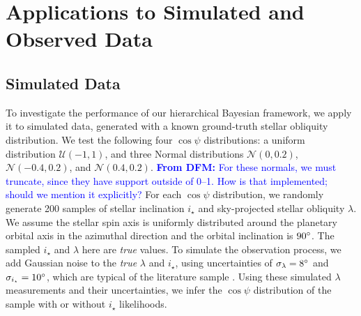 \documentclass[twocolumn,times]{aastex631}
\newcommand{\dfm}[1]{\textcolor{blue}{\textbf{From DFM:} #1}}
\begin{document}
\section{Applications to Simulated and Observed Data}\label{sec:applications}

\subsection{Simulated Data}\label{subsec:sims}

To investigate the performance of our hierarchical Bayesian framework, we apply it to simulated data, generated with a known ground-truth stellar obliquity distribution.
We test the following four $\cos{\psi}$ distributions: a uniform distribution $\mathcal{U}(-1,1)$, and three Normal distributions $\mathcal{N}(0,0.2)$, $\mathcal{N}(-0.4,0.2)$, and $\mathcal{N}(0.4,0.2)$.
\dfm{For these normals, we must truncate, since they have support outside of 0--1. How is that implemented; should we mention it explicitly?}
For each $\cos{\psi}$ distribution, we randomly generate 200 samples of stellar inclination $i_\star$ and sky-projected stellar obliquity $\lambda$. We assume the stellar spin axis is uniformly distributed around the planetary orbital axis in the azimuthal direction and the orbital inclination is $90\mbox{$^\circ$}$. 
The sampled $i_\star$ and $\lambda$ here are \emph{true} values. 
To simulate the observation process, we add Gaussian noise to the \emph{true} $\lambda$ and $i_\star$, using uncertainties of $\sigma_{\lambda} = 8\mbox{$^\circ$}$ and $\sigma_{i_\star} = 10\mbox{$^\circ$}$, which are typical of the literature sample \cite{Albrecht22}.
Using these simulated $\lambda$ measurements and their uncertainties, we infer the $\cos{\psi}$ distribution of the sample with or without $i_\star$ likelihoods. 
\end{document}
